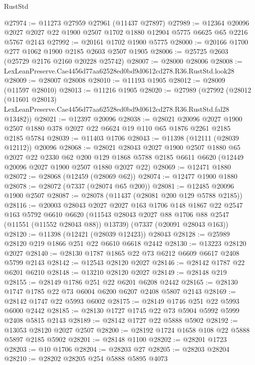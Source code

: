 \begin{lexlean}{RustStd}
\begin{coremodule}
@27974 := @11273 @27959 @27961 (@11437 @27897)
@27989 := @12364
    @20096
    @2027
    @2027
    @22
    @1900
    @2507
    @1702
    @1880
    @12904
    @5775
    @6625
    @65
    @2216
    @5767
    @2143
@27992 := @20161 @1702 @1900 @5775
@28000 := @20166 @1700 @277 @1062 @1900 @2185 @2603 @2507 @1905
@28006 := @25725 @2603 (@25729 @2176 @2160 @20228 @25742)
@28007 := @28000 @28006
@28008 := LexLeanPreserve.Cae4456d77aa62528ed0bd9d0612cd278.R36.RustStd.look28
@28009 := @28007 @28008
@28010 := @11193 @1905
@28012 := @28009 (@11597 @28010)
@28013 := @11216 @1905
@28020 := @27989
    (@27992
      (@28012
        (@11601 @28013)
        LexLeanPreserve.Cae4456d77aa62528ed0bd9d0612cd278.R36.RustStd.fal28
        @13482))
@28021 := @12397 @20096
@28038 := @28021
    @20096
    @2027
    @1900
    @2507
    @1880
    @378
    @2027
    @22
    @6624
    @19
    @110
    @65
    @1876
    @2261
    @2185
    @2185
    @5784
@28039 := @11403 @1706
@28043 := @11398 (@12111 (@28039 @12112)) @20096
@28068 := @28021
    @28043
    @2027
    @1900
    @2507
    @1880
    @65
    @2027
    @22
    @2330
    @62
    @200
    @129
    @1868
    @5788
    @2185
    @6611
    @6620
    (@12449 @20096 @2027 @1900 @2507 @1880 @2027 @22)
@28069 := @12471 @1880
@28072 := @28068 (@12459 (@28069 @62))
@28074 := @12477 @1900 @1880
@28078 := @28072 (@7337 (@28074 @65 @200))
@28081 := @12485 @20096 @1900 @2507
@28087 := @28078 (@11437 (@28081 @200 @129 @5788 @2185))
@28116 := @20003
    @28043
    @2027
    @2027
    @163
    @1706
    @148
    @1867
    @22
    @2547
    @163
    @5792
    @6610
    @6620
    (@11543 @28043 @2027 @88 @1706 @88 @2547 (@11551 (@11552 @28043 @88)) @13739)
    (@7337 (@20091 @28043 @163))
@28120 := @11398 (@12421 (@28039 @12423)) @28043
@28128 := @25989 @28120 @219 @1866 @251 @22 @6610 @6618 @2442
@28130 := @13223 @28120 @2027
@28140 := @28130 @1787 @1865 @22 @73 @6212 @6609 @6617 @2408 @5799 @2143
@28142 := @12543 @28120 @2027
@28146 := @28142 @1787 @22 @6201 @6210
@28148 := @13210 @28120 @2027
@28149 := @28148 @219
@28155 := @28149 @1786 @251 @22 @6201 @6208 @2442
@28165 := @28130 @1747 @1785 @22 @73 @6004 @6200 @6207 @2408 @5807 @2143
@28169 := @28142 @1747 @22 @5993 @6002
@28175 := @28149 @1746 @251 @22 @5993 @6000 @2442
@28185 := @28130 @1727 @1745 @22 @73 @5904 @5992 @5999 @2408 @5815 @2143
@28189 := @28142 @1727 @22 @5888 @5902
@28192 := @13053 @28120 @2027 @2507
@28200 := @28192 @1724 @1658 @108 @22 @5888 @5897 @2185 @5902
@28201 := @28148 @1100
@28202 := @28201 @1723
@28203 := @10 @1706
@28204 := @28203 @27
@28205 := @28203 @28204
@28210 := @28202 @28205 @254 @5888 @5895 @4073

\end{coremodule}
\end{lexlean}
